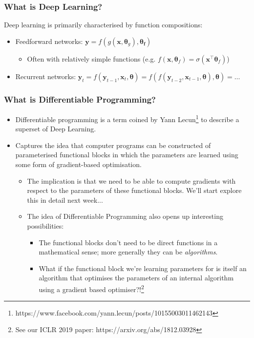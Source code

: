 \documentclass[\beamerclass]{beamer}
\begin{document}
\begin{frame}
\frametitle{What is Deep Learning?}

Deep learning is primarily characterised by function compositions: \\ \vspace{10mm}
\begin{itemize}
	\item<+-> Feedforward networks: $\bm{y} = f (g(\bm{x}, \bm\theta_g), \bm{\theta_f})$
	\begin{itemize}
		\item Often with relatively simple functions (e.g. $f(\bm x, \bm{\theta}_f) = \sigma(\bm{x}^\top \bm{\theta}_f)$)
	\end{itemize} \vspace{3mm}
	\item<+-> Recurrent networks: $\bm y_t = f(\bm y_{t-1}, \bm x_t, \bm\theta) = f(f(\bm y_{t-2}, \bm x_{t-1}, \bm\theta), \bm\theta) = \dots$
\end{itemize}
\vspace{10mm}


\end{frame}

\begin{frame}
\frametitle{What is Differentiable Programming?}
	
\begin{itemize}
	\item<+-> Differentiable programming is a term coined by Yann Lecun\footnote{https://www.facebook.com/yann.lecun/posts/10155003011462143} to describe a superset of Deep Learning.
	\item<+-> Captures the idea that computer programs can be constructed of parameterised functional blocks in which the parameters are learned using some form of gradient-based optimisation.
	\begin{itemize}
		\item<+-> The implication is that we need to be able to compute gradients with respect to the parameters of these functional blocks. We'll start explore this in detail next week...
		\item<+-> The idea of Differentiable Programming also opens up interesting possibilities: 
		\begin{itemize}
			\item The functional blocks don't need to be direct functions in a mathematical sense; more generally they can be \emph{algorithms}.
			\item What if the functional block we're learning parameters for is itself an algorithm that optimises the parameters of an internal algorithm using a gradient based optimiser?!\footnote{See our ICLR 2019 paper: https://arxiv.org/abs/1812.03928}
		\end{itemize}
	\end{itemize}
\end{itemize}
\end{frame}
\end{document}
